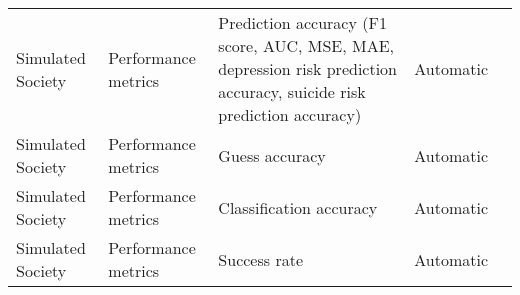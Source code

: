 \begin{small}
\begin{center}
\begin{longtable}{@{}p{}p{}p{}p{}p{}@{}}
Simulated Society        & Performance metrics                 & Prediction accuracy (F1 score, AUC, MSE, MAE, depression risk prediction accuracy, suicide risk prediction accuracy)                                                                                        & Automatic & \cite{lan2024depressiondiagnosisdialoguesimulation}                                                                                                                                                                                                                                                                                                                                                                                          \\
Simulated Society        & Performance metrics                 & Guess accuracy                                                                                                                                                                                              & Automatic & \cite{leng2024llmagentsexhibitsocial}                                                                                                                                                                                                                                                                                                                                                                                              \\
Simulated Society        & Performance metrics                 & Classification accuracy                                                                                                                                                                                     & Automatic & \cite{li2024hello}                                                                                                                                                                                                                                                                                                                                                                                                        \\
Simulated Society        & Performance metrics                 & Success rate                                                                                                                                                                                                & Automatic & \cite{kaiya2023lyfeagentsgenerativeagents}                                                                                                                                                                                                                                                                                                                                                                                              \\

\end{longtable}
\end{center}
\end{small}
